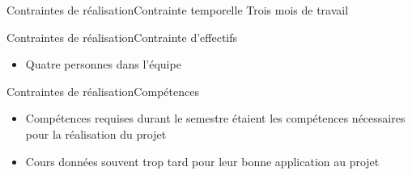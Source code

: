 \begin{frame}{Contraintes de réalisation}{Contrainte temporelle}
Trois mois de travail
\end{frame}

\begin{frame}{Contraintes de réalisation}{Contrainte d'effectifs}
\begin{itemize}
  \item Quatre personnes dans l'équipe
\end{itemize}
\end{frame}

\begin{frame}{Contraintes de réalisation}{Compétences}
\begin{itemize}
  \item Compétences requises durant le semestre étaient les compétences
  nécessaires pour la réalisation du projet
  \item Cours données souvent trop tard pour leur bonne application au projet
\end{itemize}
\end{frame}